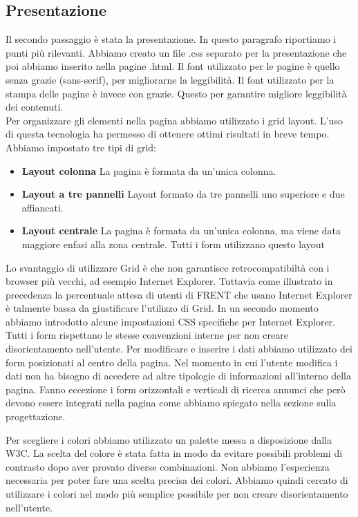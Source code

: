 \documentclass[1_relazione.tex]{subfiles}
\begin{document}
\subsection{Presentazione}
Il secondo passaggio \`{e} stata la presentazione. In questo paragrafo riportiamo i punti pi\`{u} rilevanti. Abbiamo creato un file .css separato per la presentazione che poi abbiamo inserito nella pagine .html. Il font utilizzato per le pagine \`{e} quello senza grazie (sans-serif), per migliorarne la leggibilit\`{a}. Il font utilizzato per la stampa delle pagine \`{e} invece con grazie. Questo per garantire migliore leggibilit\`{a} dei contenuti.  \\
Per organizzare gli elementi nella pagina abbiamo utilizzato i grid layout. L'uso di questa tecnologia ha permesso di ottenere ottimi risultati in breve tempo. Abbiamo impostato tre tipi di grid:
\begin{itemize}
\item \textbf{Layout colonna} La pagina è formata da un'unica colonna.
\item \textbf{Layout a tre pannelli} Layout formato da tre pannelli uno superiore e due affiancati.
\item \textbf{Layout centrale} La pagina è formata da un'unica colonna, ma viene data maggiore enfasi alla zona centrale. Tutti i form utilizzano questo layout
\end{itemize}

Lo svantaggio di utilizzare Grid \`{e} che non garantisce retrocompatibilt\`{a} con i browser pi\`{u} vecchi, ad esempio Internet Explorer. Tuttavia come illustrato in precedenza la percentuale attesa di utenti di FRENT che usano Internet Explorer \`{e} talmente bassa da giustificare l'utilizzo di Grid. In un secondo momento abbiamo introdotto alcune impostazioni CSS specifiche per Internet Explorer. \\
Tutti i form rispettano le stesse convenzioni interne per non creare disorientamento nell'utente. Per modificare e inserire i dati abbiamo utilizzato dei form posizionati al centro della pagina. Nel momento in cui l'utente modifica i dati non ha bisogno di accedere ad altre tipologie di informazioni all'interno della pagina. Fanno eccezione i form orizzontali e verticali di ricerca annunci che per\`{o} devono essere integrati nella pagina come abbiamo spiegato nella sezione sulla progettazione.



Per scegliere i colori abbiamo utilizzato un palette messa a disposizione dalla W3C. La scelta del colore \`{e} stata fatta in modo da evitare possibili problemi di contrasto dopo aver provato diverse combinazioni. Non abbiamo l'esperienza necessaria per poter fare una scelta precisa dei colori. Abbiamo quindi cercato di utilizzare i colori nel modo pi\`{u} semplice possibile per non creare disorientamento nell'utente.
\end{document}
